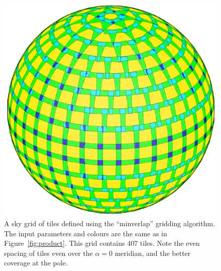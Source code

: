\begin{colsection}
\begin{colsection}
\begin{figure}[p]
\begin{minipage}[c]{0.46\textwidth}
\includegraphics[width=\linewidth]{images/algo_minverlap.pdf}
\end{minipage}
\hfill
\begin{minipage}[c]{0.50\textwidth}
\caption[The ``minverlap'' gridding algorithm]{A sky grid of tiles defined using the ``minverlap'' gridding algorithm. The input parameters and colours are the same as in Figure~\ref{fig:product}. This grid contains 407 tiles.  Note the even spacing of tiles even over the $\alpha=0$ meridian, and the better coverage at the pole.}
\label{fig:minverlap}
\end{minipage}
\end{figure}



\end{colsection}
\end{colsection}
